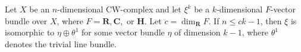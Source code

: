 Let $X$ be an $n$-dimensional CW-complex and let $\xi^k$ be a $k$-dimensional $F$-vector bundle over $X$, where $F = \mathbf{R}, \mathbf{C},$ or $\mathbf{H}$. Let $c = \dim_{\mathbf{R}} F$. If $n \leq ck - 1$, then $\xi$ is isomorphic to $\eta \oplus \theta^1$ for some vector bundle $\eta$ of dimension $k-1$, where $\theta^1$ denotes the trivial line bundle.
